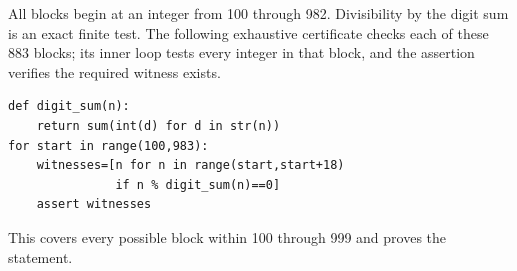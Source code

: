 All blocks begin at an integer from 100 through 982. Divisibility by the digit sum is an exact finite test. The following exhaustive certificate checks each of these 883 blocks; its inner loop tests every integer in that block, and the assertion verifies the required witness exists.
\begin{verbatim}
def digit_sum(n):
    return sum(int(d) for d in str(n))
for start in range(100,983):
    witnesses=[n for n in range(start,start+18)
               if n % digit_sum(n)==0]
    assert witnesses
\end{verbatim}
This covers every possible block within 100 through 999 and proves the statement.
